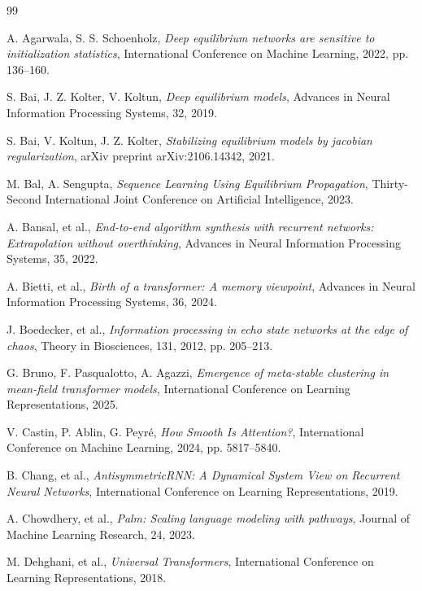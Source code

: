 \documentclass{zapiski}
\theoremstyle{plain}
\theoremstyle{definition}
\theoremstyle{remark}
\begin{document}
\begin{thebibliography}{99}

A. Agarwala, S. S. Schoenholz, \emph{Deep equilibrium networks are sensitive to initialization statistics}, International Conference on Machine Learning, 2022, pp. 136--160.

S. Bai, J. Z. Kolter, V. Koltun, \emph{Deep equilibrium models}, Advances in Neural Information Processing Systems, 32, 2019.

S. Bai, V. Koltun, J. Z. Kolter, \emph{Stabilizing equilibrium models by jacobian regularization}, arXiv preprint arXiv:2106.14342, 2021.

M. Bal, A. Sengupta, \emph{Sequence Learning Using Equilibrium Propagation}, Thirty-Second International Joint Conference on Artificial Intelligence, 2023.

A. Bansal, et al., \emph{End-to-end algorithm synthesis with recurrent networks: Extrapolation without overthinking}, Advances in Neural Information Processing Systems, 35, 2022.

A. Bietti, et al., \emph{Birth of a transformer: A memory viewpoint}, Advances in Neural Information Processing Systems, 36, 2024.

J. Boedecker, et al., \emph{Information processing in echo state networks at the edge of chaos}, Theory in Biosciences, 131, 2012, pp. 205--213.

G. Bruno, F. Pasqualotto, A. Agazzi, \emph{Emergence of meta-stable clustering in mean-field transformer models}, International Conference on Learning Representations, 2025.

V. Castin, P. Ablin, G. Peyr{\'e}, \emph{How Smooth Is Attention?}, International Conference on Machine Learning, 2024, pp. 5817--5840.

B. Chang, et al., \emph{AntisymmetricRNN: A Dynamical System View on Recurrent Neural Networks}, International Conference on Learning Representations, 2019.

A. Chowdhery, et al., \emph{Palm: Scaling language modeling with pathways}, Journal of Machine Learning Research, 24, 2023.

M. Dehghani, et al., \emph{Universal Transformers}, International Conference on Learning Representations, 2018.


\end{thebibliography}
\end{document}
